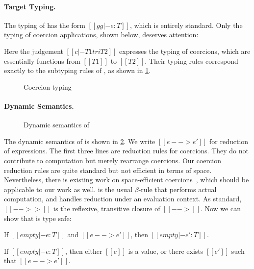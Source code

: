 \paragraph{Target Typing.}
The typing of \tname has the form $[[gg |- e : T]]$, which is entirely standard. Only the typing of coercion
applications, shown below, deserves attention:
\begin{mathpar}
\end{mathpar}
Here the judgement $[[c |- T1 tri T2]]$ expresses the typing of coercions, which
are essentially functions from $[[T1]]$ to $[[T2]]$. Their typing
rules correspond exactly to the subtyping rules of \namee, as
shown in \cref{fig:co}.

\begin{figure}[t]
  \centering
  \caption{Coercion typing}
  \label{fig:co}
\end{figure}

\paragraph{Dynamic Semantics.}

\begin{figure}[t]
  \centering
{}
  \caption{Dynamic semantics of \tname}
  \label{fig:coercion_red}
\end{figure}

The dynamic semantics of \tname is shown in \cref{fig:coercion_red}. We write
$[[e --> e']]$ for reduction of expressions. The first three lines are reduction
rules for coercions. They do not contribute to computation but merely rearrange
coercions. Our coercion reduction rules are quite standard but not efficient in
terms of space. Nevertheless, there is existing work on space-efficient
coercions~\citep{Siek_2015, herman2010space}, which should be applicable to our
work as well.  is the usual $\beta$-rule that performs actual
computation, and  handles reduction under an evaluation context. As
standard, $[[-->>]]$ is the reflexive, transitive closure of $[[-->]]$.
Now we can show that \tname is type safe:
\begin{theorem}[Preservation]
  If $[[empty |- e : T]]$ and $[[e --> e']]$, then $[[empty |- e' : T]]$.
\end{theorem}
\begin{theorem}[Progress]
  If $[[empty |- e : T]]$, then either $[[e]]$ is a value, or there exists $[[e']]$ such
  that $[[e --> e']]$.
\end{theorem}




